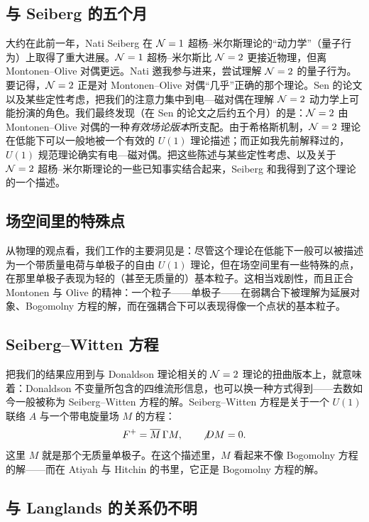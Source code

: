 \subsection{与 Seiberg 的五个月}

大约在此前一年，Nati Seiberg 在 $\cN=1$ 超杨--米尔斯理论的“动力学”（量子行为）上取得了重大进展。$\cN=1$ 超杨--米尔斯比 $\cN=2$ 更接近物理，但离 Montonen--Olive 对偶更远。Nati 邀我参与进来，尝试理解 $\cN=2$ 的量子行为。要记得，$\cN=2$ 正是对 Montonen--Olive 对偶“几乎”正确的那个理论。Sen 的论文以及某些定性考虑，把我们的注意力集中到电—磁对偶在理解 $\cN=2$ 动力学上可能扮演的角色。我们最终发现（在 Sen 的论文之后约五个月）的是：$\cN=2$ 由 Montonen--Olive 对偶的一种\emph{有效场论版本}所支配。由于希格斯机制，$\cN=2$ 理论在低能下可以一般地被一个有效的 $U(1)$ 理论描述；而正如我先前解释过的，$U(1)$ 规范理论确实有电—磁对偶。把这些陈述与某些定性考虑、以及关于 $\cN=2$ 超杨--米尔斯理论的一些已知事实结合起来，Seiberg 和我得到了这个理论的一个描述。

\subsection{场空间里的特殊点}

从物理的观点看，我们工作的主要洞见是：尽管这个理论在低能下一般可以被描述为一个带质量电荷与单极子的自由 $U(1)$ 理论，但在场空间里有一些特殊的点，在那里单极子表现为轻的（甚至无质量的）基本粒子。这相当戏剧性，而且正合 Montonen 与 Olive 的精神：一个粒子——单极子——在弱耦合下被理解为延展对象、Bogomolny 方程的解，而在强耦合下可以表现得像一个点状的基本粒子。

\subsection{Seiberg--Witten 方程}

把我们的结果应用到与 Donaldson 理论相关的 $\cN=2$ 理论的扭曲版本上，就意味着：Donaldson 不变量所包含的四维流形信息，也可以换一种方式得到——去数如今一般被称为 Seiberg--Witten 方程的解。Seiberg--Witten 方程是关于一个 $U(1)$ 联络 $A$ 与一个带电旋量场 $M$ 的方程：
\begin{equation}
  F^+=\overline{M}\,\Gamma M,\qquad \slashed{D}M=0 .
  \label{eq:sw}
\end{equation}
这里 $M$ 就是那个无质量单极子。在这个描述里，$M$ 看起来不像 Bogomolny 方程的解——而在 Atiyah 与 Hitchin 的书里，它正是 Bogomolny 方程的解。

\subsection{与 Langlands 的关系仍不明}

